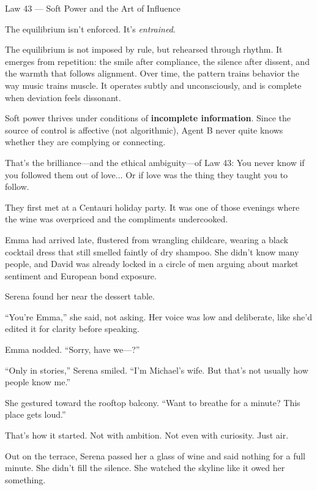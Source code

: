\begin{PhilosophicalSidebar}{Law 43 --- Soft Power and the Art of Influence}
  \medskip
  
  The equilibrium isn’t enforced. It’s \emph{entrained}. 
  
  \medskip

  The equilibrium is not imposed by rule, but rehearsed through rhythm.  
  It emerges from repetition: the smile after compliance, the silence after dissent, and the warmth that follows 
  alignment.  
  Over time, the pattern trains behavior the way music trains muscle. It operates subtly and unconsciously, 
  and is complete when deviation feels dissonant.
  
  \medskip
  
  Soft power thrives under conditions of \textbf{incomplete information}. Since the source of 
  control is affective (not algorithmic), Agent B never quite knows whether they are complying or connecting.
  
  \medskip
  
  That’s the brilliance—and the ethical ambiguity—of Law 43:
  You never know if you followed them out of love...
  Or if love was the thing they taught you to follow.
  
\end{PhilosophicalSidebar}

\medskip

They first met at a Centauri holiday party. It was one of those evenings where the wine was overpriced and 
the compliments undercooked.

Emma had arrived late, flustered from wrangling childcare, wearing a black cocktail dress that still 
smelled faintly of dry shampoo. She didn’t know many people, and David was already locked in a circle of 
men arguing about market sentiment and European bond exposure.

Serena found her near the dessert table.

``You’re Emma,'' she said, not asking. Her voice was low and deliberate, like she’d edited it for 
clarity before speaking.

Emma nodded. ``Sorry, have we—?''

``Only in stories,'' Serena smiled. ``I’m Michael’s wife. But that’s not usually how people know me.''

She gestured toward the rooftop balcony. ``Want to breathe for a minute? This place gets loud.''

That’s how it started. Not with ambition. Not even with curiosity. Just air.

Out on the terrace, Serena passed her a glass of wine and said nothing for a full minute. She didn’t 
fill the silence. She watched the skyline like it owed her something.

